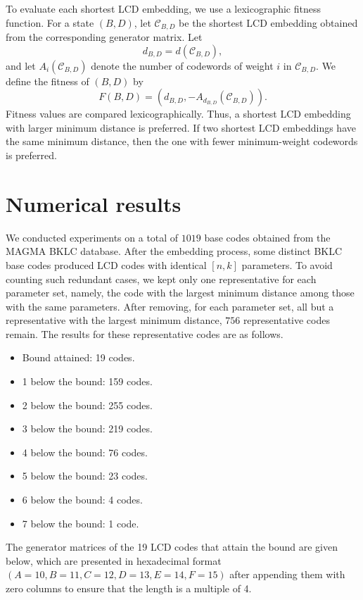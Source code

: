 \documentclass{article}
\theoremstyle{definition}
\theoremstyle{remark}
\begin{document}
To evaluate each shortest LCD embedding, we use a lexicographic fitness function. For a state $(B,D)$, let $\mathcal{C}_{B,D}$ be the shortest LCD embedding obtained from the corresponding generator matrix. Let
    \[
    d_{B,D}=d(\mathcal{C}_{B,D}),
    \]
    and let $A_i(\mathcal{C}_{B,D})$ denote the number of codewords of weight $i$ in $\mathcal{C}_{B,D}$. We define the fitness of $(B,D)$ by
    \[
    F(B,D)=\left(d_{B,D},-A_{d_{B,D}}(\mathcal{C}_{B,D})\right).
    \]
    Fitness values are compared lexicographically. Thus, a shortest LCD embedding with larger minimum distance is preferred. If two shortest LCD embeddings have the same minimum distance, then the one with fewer minimum-weight codewords is preferred.


\section{Numerical results}
We conducted experiments on a total of $1019$ base codes obtained from the MAGMA BKLC database. After the embedding process, some distinct BKLC base codes produced LCD codes with identical $[n, k]$ parameters. To avoid counting such redundant cases, we kept only one representative for each parameter set, namely, the code with the largest minimum distance among those with the same parameters. After removing, for each parameter set, all but a representative with the largest minimum distance, $756$ representative codes remain. The results for these representative codes are as follows.
\begin{itemize}
    \item Bound attained: 19 codes.
    \item 1 below the bound: 159 codes.
    \item 2 below the bound: 255 codes.
    \item 3 below the bound: 219 codes.
    \item 4 below the bound: 76 codes.
    \item 5 below the bound: 23 codes.
    \item 6 below the bound: 4 codes.
    \item 7 below the bound: 1 code.
\end{itemize}
The generator matrices of the 19 LCD codes that attain the bound are given below, which are presented in hexadecimal format $(A=10, B=11, C=12, D=13, E=14, F=15)$ after appending them with zero columns to ensure that the length is a multiple of 4.
\end{document}
